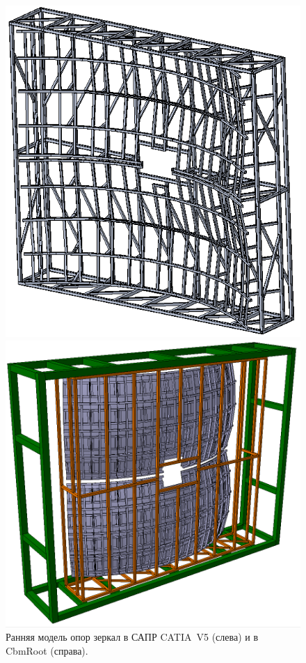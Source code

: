 \begin{figure}[H]
\begin{minipage}[b]{0.495\textwidth}
\includegraphics[width=1.0\textwidth]{pictures/Frame_small_CAD.png}
\end{minipage}
\hspace{0.01\textwidth}
\begin{minipage}[b]{0.495\textwidth}
\includegraphics[width=1.0\textwidth]{pictures/Frame_small_MC2.png}
\end{minipage}
\caption{Ранняя модель опор зеркал в САПР CATIA~V5 (слева) и в CbmRoot (справа).}
\label{fig:SmallFrameCADandMC}
\end{figure}

